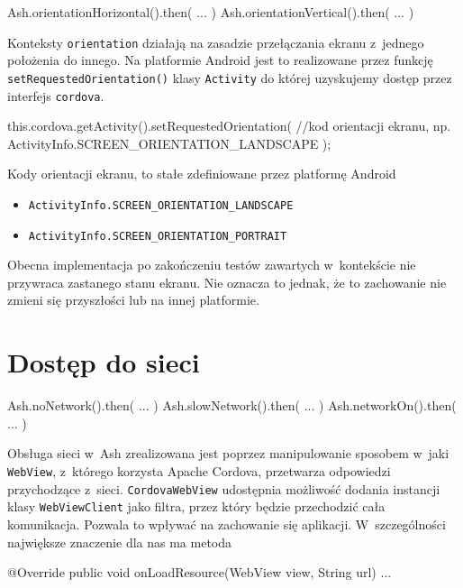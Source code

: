 \documentclass{xmgr}
\begin{document}
\begin{javascriptcode}
  Ash.orientationHorizontal().then( ... )   
  Ash.orientationVertical().then( ... ) 
\end{javascriptcode}

Konteksty \texttt{orientation} działają na zasadzie przełączania ekranu z~jednego położenia do innego. Na platformie Android jest to realizowane przez funkcję \texttt{setRequestedOrientation()} klasy \texttt{Activity} do której uzyskujemy dostęp przez interfejs \texttt{cordova}. 

\begin{javacode}
this.cordova.getActivity().setRequestedOrientation(
  //kod orientacji ekranu, np. 
  ActivityInfo.SCREEN_ORIENTATION_LANDSCAPE
);
\end{javacode}

Kody orientacji ekranu, to stałe zdefiniowane przez platformę Android
\begin{itemize}
  \item \texttt{ActivityInfo.SCREEN\_ORIENTATION\_LANDSCAPE}
  \item \texttt{ActivityInfo.SCREEN\_ORIENTATION\_PORTRAIT}
\end{itemize}

Obecna implementacja po zakończeniu testów zawartych w~kontekście nie przywraca zastanego stanu ekranu. Nie oznacza to jednak, że to zachowanie nie zmieni się przyszłości lub na innej platformie.

\section{Dostęp do sieci}

\begin{javascriptcode}
Ash.noNetwork().then( ... ) 
Ash.slowNetwork().then( ... ) 
Ash.networkOn().then( ... ) 
\end{javascriptcode}

Obsługa sieci w~Ash zrealizowana jest poprzez manipulowanie sposobem w~jaki \texttt{WebView}, z~którego korzysta Apache Cordova, przetwarza odpowiedzi przychodzące z~sieci. \texttt{CordovaWebView} udostępnia możliwość dodania instancji klasy \texttt{WebViewClient} jako filtra, przez który będzie przechodzić cała komunikacja. Pozwala to wpływać na zachowanie się aplikacji. W~szczególności największe znaczenie dla nas ma metoda

\begin{javacode}
   @Override
   public void onLoadResource(WebView view, String url) {
       ...
   }
\end{javacode}
\end{document}
